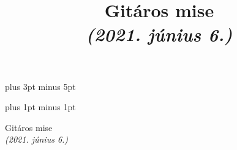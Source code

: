 \documentclass[a5paper,twoside]{article}
\title{Gitáros mise\\\textit{(2021. június 6.)}}
\date{}
\renewcommand{\_}[1]{\underline{#1}} %
\begin{document}


  \versesep=12pt plus 3pt minus 5pt

  \iflyric
    \baselineadj=2pt plus 1pt minus 1pt
  \fi

  \begin{center}
    \vspace*{1.5cm}
    {\huge Gitáros mise} \\
    \vspace*{0.1cm}
    {\Large \textit{(2021. június 6.)}}
    \vspace{2cm}
  \end{center}


  \begin{songs}{}
    
    

    

    

    

    
  \end{songs}
\end{document}
